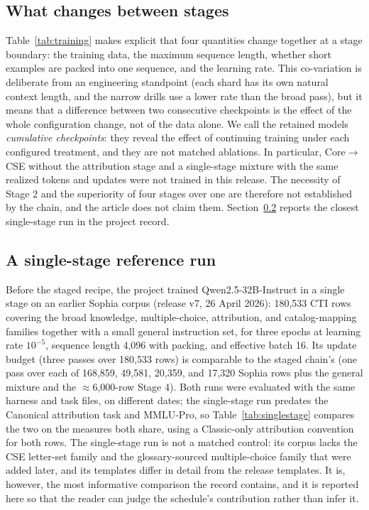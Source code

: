 \documentclass[preprint,12pt,authoryear]{elsarticle}
\begin{document}
\subsection{What changes between stages}
Table~\ref{tab:training} makes explicit that four quantities change together at a stage boundary: the training data, the maximum sequence length, whether short examples are packed into one sequence, and the learning rate. This co-variation is deliberate from an engineering standpoint (each shard has its own natural context length, and the narrow drills use a lower rate than the broad pass), but it means that a difference between two consecutive checkpoints is the effect of the whole configuration change, not of the data alone. We call the retained models \emph{cumulative checkpoints}: they reveal the effect of continuing training under each configured treatment, and they are not matched ablations. In particular, Core$\rightarrow$CSE without the attribution stage and a single-stage mixture with the same realized tokens and updates were not trained in this release. The necessity of Stage 2 and the superiority of four stages over one are therefore not established by the chain, and the article does not claim them. Section~\ref{sec:singlestage} reports the closest single-stage run in the project record.

\subsection{A single-stage reference run}\label{sec:singlestage}
Before the staged recipe, the project trained Qwen2.5-32B-Instruct in a single stage on an earlier Sophia corpus (release v7, 26 April 2026): 180,533 CTI rows covering the broad knowledge, multiple-choice, attribution, and catalog-mapping families together with a small general instruction set, for three epochs at learning rate $10^{-5}$, sequence length 4,096 with packing, and effective batch 16. Its update budget (three passes over 180,533 rows) is comparable to the staged chain's (one pass over each of 168,859, 49,581, 20,359, and 17,320 Sophia rows plus the general mixture and the $\approx$6,000-row Stage 4). Both runs were evaluated with the same harness and task files, on different dates; the single-stage run predates the Canonical attribution task and MMLU-Pro, so Table~\ref{tab:singlestage} compares the two on the measures both share, using a Classic-only attribution convention for both rows. The single-stage run is not a matched control: its corpus lacks the CSE letter-set family and the glossary-sourced multiple-choice family that were added later, and its templates differ in detail from the release templates. It is, however, the most informative comparison the record contains, and it is reported here so that the reader can judge the schedule's contribution rather than infer it.
\end{document}
